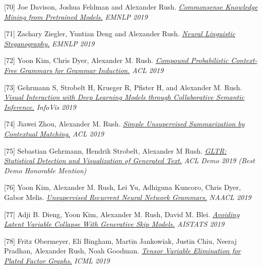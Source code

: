 \documentclass[10pt]{article}
\begin{document}
\medskip


[70] \ind Joe Davison, Joshua Feldman and Alexander Rush. \emph{\href{ None }{ Commonsense Knowledge Mining from Pretrained Models.} }\emph{ EMNLP 2019 }

\medskip


[71] \ind Zachary Ziegler, Yuntian Deng and Alexander Rush. \emph{\href{ https://arxiv.org/abs/1909.01496 }{ Neural Linguistic Steganography.} }\emph{ EMNLP 2019 }

\medskip


[72] \ind Yoon Kim,  Chris Dyer, Alexander M. Rush. \emph{\href{ https://www.aclweb.org/anthology/P19-1228/ }{ Compound Probabilistic Context-Free Grammars for Grammar Induction.} }\emph{ ACL 2019 }

\medskip


[73] \ind Gehrmann S, Strobelt H, Krueger R, Pfister H, and Alexander M. Rush. \emph{\href{ https://arxiv.org/abs/1907.10739 }{ Visual Interaction with Deep Learning Models through Collaborative Semantic Inference.} }\emph{ InfoVis 2019 }

\medskip


[74] \ind Jiawei Zhou, Alexander M. Rush. \emph{\href{ https://www.aclweb.org/anthology/P19-1503 }{ Simple Unsupervised Summarization by Contextual Matching.} }\emph{ ACL 2019 }

\medskip


[75] \ind Sebastian Gehrmann, Hendrik Strobelt, Alexander M Rush. \emph{\href{ https://arxiv.org/abs/1906.04043 }{ GLTR: Statistical Detection and Visualization of Generated Text.} }\emph{ ACL Demo 2019 (Best Demo Honorable Mention) }

\medskip


[76] \ind Yoon Kim, Alexander M. Rush, Lei Yu, Adhiguna Kuncoro, Chris Dyer, Gabor Melis. \emph{\href{ https://arxiv.org/pdf/1904.03746.pdf }{ Unsupervised Recurrent Neural Network Grammars.} }\emph{ NAACL 2019 }

\medskip


[77] \ind Adji B. Dieng, Yoon Kim, Alexander M. Rush, David M. Blei. \emph{\href{ https://arxiv.org/pdf/1807.04863.pdf }{ Avoiding Latent Variable Collapse With Generative Skip Models.} }\emph{ AISTATS 2019 }

\medskip


[78] \ind Fritz Obermeyer, Eli Bingham, Martin Jankowiak, Justin Chiu, Neeraj Pradhan, Alexander Rush, Noah Goodman. \emph{\href{ https://arxiv.org/pdf/1902.03210.pdf }{ Tensor Variable Elimination for Plated Factor Graphs.} }\emph{ ICML 2019 }
\end{document}

